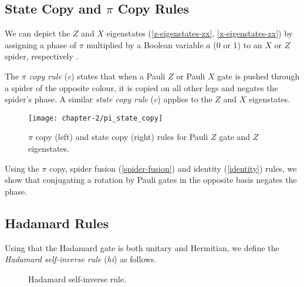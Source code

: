 

\subsection{State Copy and $\pi$ Copy Rules}%

We can depict the $Z$ and $X$ eigenstates (\ref{z-eigenstates-zx}, \ref{x-eigenstates-zx}) by assigning a phase of $\pi$ multiplied by a Boolean variable $a$ (0 or 1) to an $X$ or $Z$ spider, respectively \cite{Wetering2020}.

%

The $\pi$ \textit{copy rule} (\textit{c}) states that when a Pauli $Z$ or Pauli $X$ gate is pushed through a spider of the opposite colour, it is copied on all other legs and negates the spider's phase. A similar \textit{state copy rule} (\textit{c}) applies to the $Z$ and $X$ eigenstates.

\begin{figure}[H]
    \centering
    \texttt{[image: chapter-2/pi\_state\_copy]}
    \caption{$\pi$ copy (left) and state copy (right) rules for Pauli $Z$ gate and $Z$ eigenstates.}
    \label{state-copy}
    \label{pi-copy}
\end{figure}

Using the $\pi$ copy, spider fusion (\ref{spider-fusion}) and identity (\ref{identity}) rules, we show that conjugating a rotation by Pauli gates in the opposite basis negates the phase.



\subsection{Hadamard Rules}

Using that the Hadamard gate is both unitary and Hermitian, we define the \textit{Hadamard self-inverse rule} (\textit{hi}) as follows.

\begin{figure}[H]
    \centering
    \caption{Hadamard self-inverse rule.}
    \label{hadamard-self-inverse}
\end{figure}

